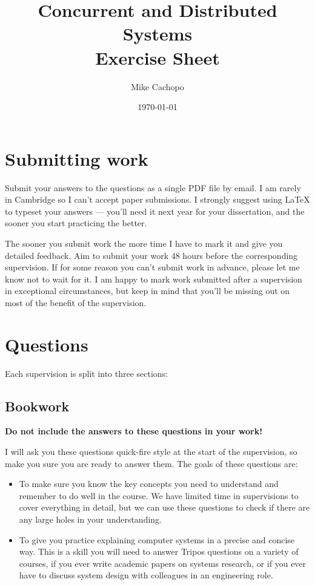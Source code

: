 \documentclass[12pt,a4paper,oneside,openright]{report}
\title{Concurrent and Distributed Systems\\ Exercise Sheet}
\date{\today}
\author{Mike Cachopo}
\begin{document}

\pagestyle{empty}

\maketitle

\newpage

\pagestyle{plain} 

\section*{Submitting work}

Submit your answers to the questions as a single PDF file by email. I
am rarely in Cambridge so I can't accept paper submissions. I strongly
suggest using LaTeX to typeset your answers --- you'll need it next
year for your dissertation, and the sooner you start practicing the
better.

The sooner you submit work the more time I have to mark it and give
you detailed feedback. Aim to submit your work 48 hours before the
corresponding supervision. If for some reason you can't submit work in
advance, please let me know not to wait for it. I am happy to mark
work submitted after a supervision in exceptional circumstances, but
keep in mind that you'll be missing out on most of the benefit of the
supervision.

\section*{Questions}

Each supervision is split into three sections:

\subsection*{Bookwork}

\textbf{Do not include the answers to these questions in your work!}

I will ask you these questions quick-fire style at the start of the
supervision, so make you sure you are ready to answer them. The goals
of these questions are:

\begin{itemize}
\item To make sure you know the key concepts you need to understand
  and remember to do well in the course. We have limited time in
  supervisions to cover everything in detail, but we can use these
  questions to check if there are any large holes in your
  understanding.
\item To give you practice explaining computer systems in a precise
  and concise way. This is a skill you will need to answer Tripos
  questions on a variety of courses, if you ever write academic papers
  on systems research, or if you ever have to discuss system design
  with colleagues in an engineering role.
\end{itemize}
\end{document}
